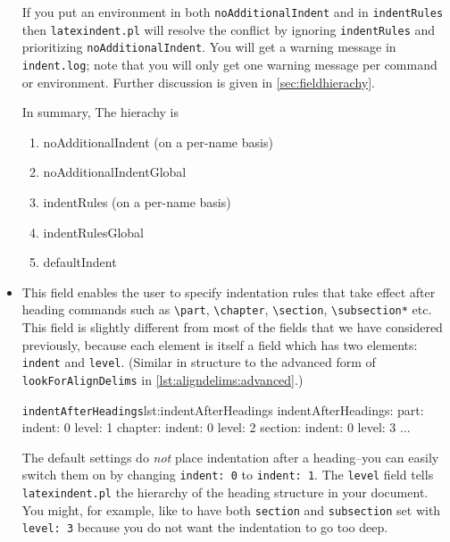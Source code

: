 \documentclass[11pt]{article}
\newcommand{\verbitem}[1]{\small\PVerb{#1}}
\begin{document}
\begin{itemize}
	If you put an environment in both \lstinline!noAdditionalIndent! and in
	\lstinline!indentRules! then \lstinline!latexindent.pl! will resolve the conflict
	by ignoring \lstinline!indentRules! and prioritizing \lstinline!noAdditionalIndent!.
	You will get a warning message in \lstinline!indent.log!; note that you will only
	get one warning message per command or environment. Further discussion
	is given in \cref{sec:fieldhierachy}.

In summary, The hierachy is
\begin{enumerate}
  \item noAdditionalIndent (on a per-name basis)
  \item noAdditionalIndentGlobal
  \item indentRules (on a per-name basis)
  \item indentRulesGlobal
  \item defaultIndent
\end{enumerate}


	\item[\verbitem{indentAfterHeadings}] This field enables the user to specify
	      indentation rules that take effect after heading commands such as \lstinline!\part!, \lstinline!\chapter!,
	      \lstinline!\section!, \lstinline!\subsection*! etc. This field is slightly different from most
	      of the fields that we have considered previously, because each element is
	      itself a field which has two elements: \lstinline!indent! and \lstinline!level!. (Similar 
          in structure to the advanced form of  \lstinline!lookForAlignDelims! in \cref{lst:aligndelims:advanced}.)
	      \begin{cmhlistings}[style=yaml]{\lstinline!indentAfterHeadings!}{lst:indentAfterHeadings}
indentAfterHeadings:
    part:
       indent: 0
       level: 1
    chapter:
       indent: 0
       level: 2
    section:
       indent: 0
       level: 3
    ...
	\end{cmhlistings}
	The default settings do \emph{not} place indentation after a heading--you
	can easily switch them on by changing \lstinline!indent: 0! to \lstinline!indent: 1!.
	The \lstinline!level! field tells \lstinline!latexindent.pl! the hierarchy of the heading
	structure in your document. You might, for example, like to have both \lstinline!section!
	and \lstinline!subsection! set with \lstinline!level: 3! because you do not want the indentation to go too deep.


\end{itemize}
\end{document}
